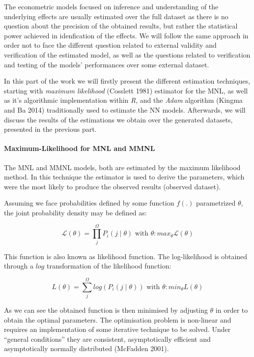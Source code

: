 \documentclass[12pt,]{article}
\let\oldparagraph\paragraph
\renewcommand{\paragraph}[1]{\oldparagraph{#1}\mbox{}}
\begin{document}
The econometric models focused on inference and understanding of the
underlying effects are usually estimated over the full dataset as there
is no question about the precision of the obtained results, but rather
the statistical power achieved in idenfication of the effects. We will
follow the same approach in order not to face the different question
related to external validity and verification of the estimated model, as
well as the questions related to verification and testing of the models'
performances over some external dataset.

In this part of the work we will firstly present the different
estimation techniques, starting with \emph{maximum likelihood} (Cosslett
1981) estimator for the MNL, as well as it's algorithmic implementation
within \emph{R}, and the \emph{Adam} algorithm (Kingma and Ba 2014)
traditionally used to estimate the NN models. Afterwards, we will
discuss the results of the estimations we obtain over the generated
datasets, presented in the previous part.

\hypertarget{maximum-likelihood-for-mnl-and-mmnl}{%
\paragraph{Maximum-Likelihood for MNL and
MMNL}\label{maximum-likelihood-for-mnl-and-mmnl}}

The MNL and MMNL models, both are estimated by the maximum likelihood
method. In this technique the estimator is used to derive the
parameters, which were the most likely to produce the observed results
(observed dataset).

Assuming we face probabilities defined by some function \(f(.)\)
parametrized \(\theta\), the joint probability density may be defined
as:

\begin{equation}
\mathcal{L}(\theta) = \prod_{j}^{\Omega} P_{i}(j \mid \theta) \text{  with  } \theta: max_{\theta} \mathcal{L}(\theta)
\end{equation}

This function is also known as likelihood function. The log-likelihood
is obtained through a \(log\) transformation of the likelihood function:

\begin{equation}
L(\theta) = \sum_{j}^{\Omega} log(P_{i}(j \mid \theta)) \text{  with  } \theta: min_{\theta} L(\theta)
\end{equation}

As we can see the obtained function is then minimised by adjusting
\(\theta\) in order to obtain the optimal parameters. The optimisation
problem is non-linear and requires an implementation of some iterative
technique to be solved. Under ``general conditions'' they are
consistent, asymptotically efficient and asymptotically normally
distributed (McFadden 2001).
\end{document}
